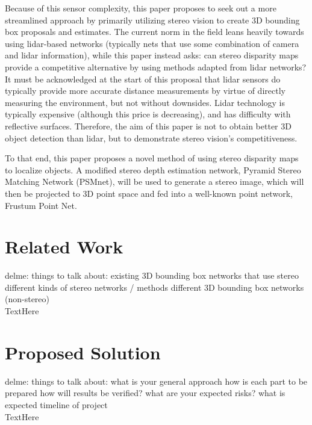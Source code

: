
Because of this sensor complexity, this paper proposes to seek out a more streamlined approach by primarily utilizing stereo vision to create 3D bounding box proposals and estimates. The current norm in the field leans heavily towards using lidar-based networks (typically nets that use some combination of camera and lidar information), while this paper instead asks: can stereo disparity maps provide a competitive alternative by using methods adapted from lidar networks? It must be acknowledged at the start of this proposal that lidar sensors do typically provide more accurate distance measurements by virtue of directly measuring the environment, but not without downsides. Lidar technology is typically expensive (although this price is decreasing), and has difficulty with reflective surfaces. Therefore, the aim of this paper is not to obtain better 3D object detection than lidar, but to demonstrate stereo vision's competitiveness. 

To that end, this paper proposes a novel method of using stereo disparity maps to localize objects. A modified stereo depth estimation network, Pyramid Stereo Matching Network (PSMnet), will be used to generate a stereo image, which will then be projected to 3D point space and fed into a well-known point network, Frustum Point Net.


\section{Related Work}
delme: things to talk about:
	existing 3D bounding box networks that use stereo
	different kinds of stereo networks / methods
	different 3D bounding box networks (non-stereo) \\
TextHere

\section{Proposed Solution}
delme: things to talk about: 
	what is your general approach
	how is each part to be prepared
	how will results be verified?
	what are your expected risks?
	what is expected timeline of project \\
TextHere








